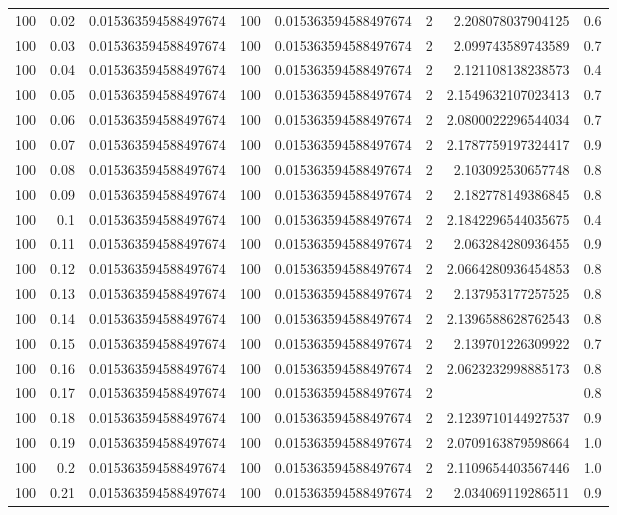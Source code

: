 \documentclass[11pt]{article}
\begin{document}
\begin{center}
\begin{tabular}{rrrrrrrr}
100 & 0.02 & 0.015363594588497674 & 100 & 0.015363594588497674 & 2 & 2.208078037904125 & 0.6\\
100 & 0.03 & 0.015363594588497674 & 100 & 0.015363594588497674 & 2 & 2.099743589743589 & 0.7\\
100 & 0.04 & 0.015363594588497674 & 100 & 0.015363594588497674 & 2 & 2.121108138238573 & 0.4\\
100 & 0.05 & 0.015363594588497674 & 100 & 0.015363594588497674 & 2 & 2.1549632107023413 & 0.7\\
100 & 0.06 & 0.015363594588497674 & 100 & 0.015363594588497674 & 2 & 2.0800022296544034 & 0.7\\
100 & 0.07 & 0.015363594588497674 & 100 & 0.015363594588497674 & 2 & 2.1787759197324417 & 0.9\\
100 & 0.08 & 0.015363594588497674 & 100 & 0.015363594588497674 & 2 & 2.103092530657748 & 0.8\\
100 & 0.09 & 0.015363594588497674 & 100 & 0.015363594588497674 & 2 & 2.182778149386845 & 0.8\\
100 & 0.1 & 0.015363594588497674 & 100 & 0.015363594588497674 & 2 & 2.1842296544035675 & 0.4\\
100 & 0.11 & 0.015363594588497674 & 100 & 0.015363594588497674 & 2 & 2.063284280936455 & 0.9\\
100 & 0.12 & 0.015363594588497674 & 100 & 0.015363594588497674 & 2 & 2.0664280936454853 & 0.8\\
100 & 0.13 & 0.015363594588497674 & 100 & 0.015363594588497674 & 2 & 2.137953177257525 & 0.8\\
100 & 0.14 & 0.015363594588497674 & 100 & 0.015363594588497674 & 2 & 2.1396588628762543 & 0.8\\
100 & 0.15 & 0.015363594588497674 & 100 & 0.015363594588497674 & 2 & 2.139701226309922 & 0.7\\
100 & 0.16 & 0.015363594588497674 & 100 & 0.015363594588497674 & 2 & 2.0623232998885173 & 0.8\\
100 & 0.17 & 0.015363594588497674 & 100 & 0.015363594588497674 & 2 &  & 0.8\\
100 & 0.18 & 0.015363594588497674 & 100 & 0.015363594588497674 & 2 & 2.1239710144927537 & 0.9\\
100 & 0.19 & 0.015363594588497674 & 100 & 0.015363594588497674 & 2 & 2.0709163879598664 & 1.0\\
100 & 0.2 & 0.015363594588497674 & 100 & 0.015363594588497674 & 2 & 2.1109654403567446 & 1.0\\
100 & 0.21 & 0.015363594588497674 & 100 & 0.015363594588497674 & 2 & 2.034069119286511 & 0.9\\

\end{tabular}
\end{center}
\end{document}
